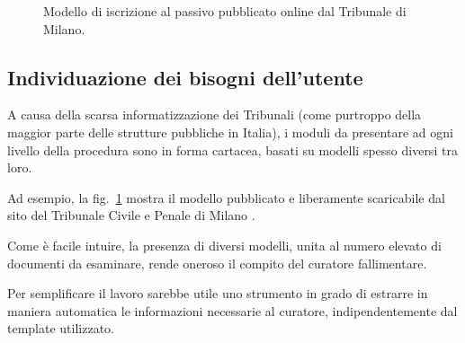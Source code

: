 \begin{figure}[H]
\centering
{}
\caption[Modello passivo tribunale Milano]{Modello di iscrizione al passivo pubblicato online dal Tribunale di Milano.}
\label{fig:modello3}
\end{figure}


\subsection{Individuazione dei bisogni dell’utente}
\label{object}
A causa della scarsa informatizzazione dei Tribunali (come purtroppo della maggior parte delle strutture pubbliche in Italia), i moduli da presentare ad ogni livello della procedura sono in forma cartacea, basati su modelli spesso diversi tra loro.

Ad esempio, la fig.~\ref{fig:modello3} mostra il modello pubblicato e liberamente scaricabile dal sito del Tribunale Civile e Penale di Milano \cite{milano:modulistica}.

Come è facile intuire, la presenza di diversi modelli, unita al numero elevato di documenti da esaminare, rende oneroso il compito del curatore fallimentare.

Per semplificare il lavoro sarebbe utile uno strumento in grado di estrarre in maniera automatica le informazioni necessarie al curatore, indipendentemente dal template utilizzato.
